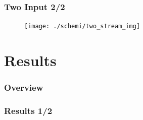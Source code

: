 \documentclass{beamer}
\begin{document}
\begin{frame}
\frametitle{Two Input 2/2}

\begin{figure}
\centering
\texttt{[image: ./schemi/two\_stream\_img]}
\end{figure}
 
\end{frame}
  
\section{Results}

\begin{frame}
\frametitle{Overview} 
	\tableofcontents[currentsection]
\end{frame}

\begin{frame}
\frametitle{Results 1/2}


\end{frame}
\end{document}
